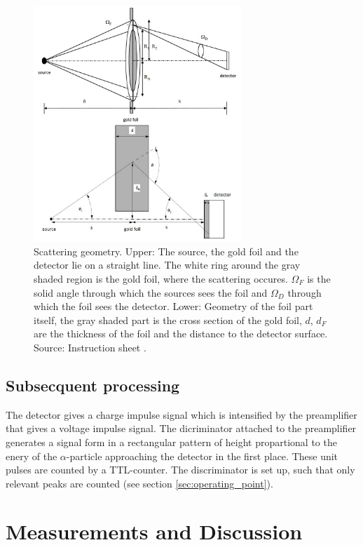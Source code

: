 \documentclass[a4paper]{article}
\begin{document}
\begin{figure}[H]
\captionsetup{singlelinecheck=off}
\centering
\includegraphics[width=0.7\textwidth]{img/geometry3.jpg}
\caption[blubb]{Scattering geometry. Upper: The source, the gold foil and the detector lie on a straight line. The white ring around the gray shaded region is the gold foil, where the scattering occures. $\Omega_F$ is the solid angle through which the sources sees the foil and $\Omega_D$ through which the foil sees the detector. Lower: Geometry of the foil part itself, the gray shaded part is the cross section of the gold foil, $d$, $d_F$ are the thickness of the foil and the distance to the detector surface. Source: Instruction sheet \cite{inst2007}.}
\label{fig:geometry}
\end{figure}

\subsection{Subsecquent processing}

The detector gives a charge impulse signal which is intensified by the preamplifier that gives a voltage impulse signal. The dicriminator attached to the preamplifier generates a signal form in a rectangular pattern of height propartional to the enery of the $\alpha$-particle approaching the detector in the first place. These unit pulses are counted by a TTL-counter. The discriminator is set up, such that only relevant peaks are counted (see section \ref{sec:operating_point}).

\section{Measurements and Discussion}
\end{document}
